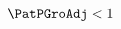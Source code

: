   \begin{equation}\begin{gathered}\begin{aligned}
    \PatPGroAdj  & < 1 \label{eq:GICNrm}
  \end{aligned}\end{gathered}\end{equation}

